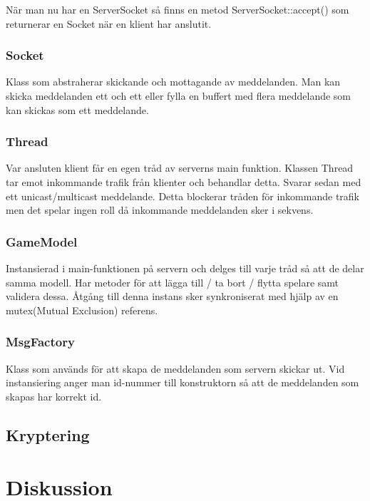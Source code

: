 \documentclass[10pt, titlepage, oneside, a4paper]{article}
\begin{document}
		När man nu har en ServerSocket så finns en metod ServerSocket::accept() som returnerar en Socket när en klient har anslutit.
		\subsubsection{Socket}
		Klass som abstraherar skickande och mottagande av meddelanden. Man kan skicka meddelanden ett och ett eller fylla en buffert med flera meddelande som kan skickas som ett meddelande.
		
		\subsubsection{Thread}
		Var ansluten klient får en egen tråd av serverns main funktion. Klassen Thread tar emot inkommande trafik från klienter och behandlar detta. Svarar sedan med ett unicast/multicast meddelande. Detta blockerar tråden för inkommande trafik men det spelar ingen roll då inkommande meddelanden sker i sekvens.
		
		\subsubsection{GameModel}
		Instansierad i main-funktionen på servern och delges till varje tråd så att de delar samma modell. Har metoder för att lägga till / ta bort / flytta spelare samt validera dessa. Åtgång till denna instans sker synkroniserat med hjälp av en mutex(Mutual Exclusion) referens.
		
		\subsubsection{MsgFactory}
		Klass som används för att skapa de meddelanden som servern skickar ut. Vid instansiering anger man id-nummer till konstruktorn så att de meddelanden som skapas har korrekt id. 
		
		\subsection{Kryptering}
		
	\section{Diskussion}%
  
    
\end{document}
